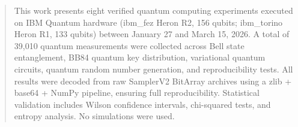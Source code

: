 \begin{abstract}
This work presents eight verified quantum computing experiments executed on IBM Quantum hardware (ibm\_fez Heron R2, 156 qubits; ibm\_torino Heron R1, 133 qubits) between January 27 and March 15, 2026. A total of 39,010 quantum measurements were collected across Bell state entanglement, BB84 quantum key distribution, variational quantum circuits, quantum random number generation, and reproducibility tests. All results were decoded from raw SamplerV2 BitArray archives using a zlib + base64 + NumPy pipeline, ensuring full reproducibility. Statistical validation includes Wilson confidence intervals, chi-squared tests, and entropy analysis. No simulations were used.
\end{abstract}
